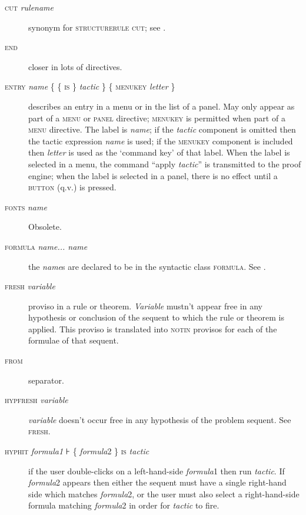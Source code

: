 \begin{description}
\item[\textsc{cut} \textit{rulename}] synonym for \textsc{structurerule} \textsc{cut}; see .

\item[\textsc{end}] closer in lots of directives.

\item[\textsc{entry} \textit{name} \{ \{ \textsc{is} \} \textit{tactic} \} \{ \textsc{menukey} \textit{letter} \}] describes an entry in a menu or in the list of a panel. May only appear as part of a \textsc{menu} or \textsc{panel} directive; \textsc{menukey} is permitted when part of a \textsc{menu} directive. The label is \textit{name}; if the \textit{tactic} component is omitted then the tactic expression \textit{name} is used; if the \textsc{menukey} component is included then \textit{letter} is used as the `command key' of that label. When the label is selected in a menu, the command ``apply \textit{tactic}'' is transmitted to the proof engine; when the label is selected in a panel, there is no effect until a \textsc{button} (q.v.) is pressed.

\item[\textsc{fonts} \textit{name}] Obsolete.

\item[\textsc{formula} \textit{name... name}] the \textit{name}s are declared to be in the syntactic class \textsc{formula}. See .

\item[\textsc{fresh} \textit{variable}] proviso in a rule or theorem. \textit{Variable} mustn't appear free in any hypothesis or conclusion of the sequent to which the rule or theorem is applied. This proviso is translated into \textsc{notin} provisos for each of the formulae of that sequent.

\item[\textsc{from}] separator.

\item[\textsc{hypfresh} \textit{variable}] \textit{variable} doesn't occur free in any hypothesis of the problem sequent. See \textsc{fresh.}

\item[\textsc{hyphit} \textit{formula1} ⊦ \{ \textit{formula}2 \} \textsc{is} \textit{tactic}] if the user double-clicks on a left-hand-side \textit{formula}1 then run \textit{tactic}. If \textit{formula}2 appears then either the sequent must have a single right-hand side which matches \textit{formula}2, or the user must also select a right-hand-side formula matching \textit{formula}2 in order for \textit{tactic} to fire.


\end{description}
